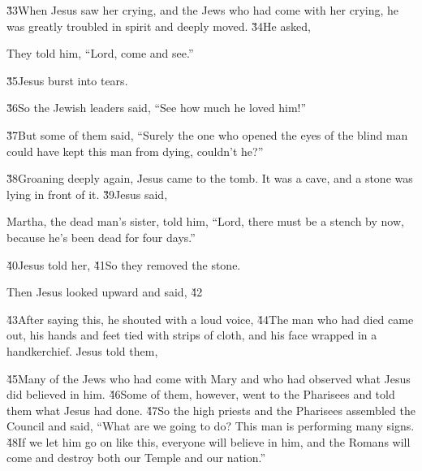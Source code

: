 \v{33}When Jesus saw her crying, and the Jews who had come with her crying, he was greatly troubled in spirit and deeply moved. \v{34}He asked, 

They told him, ``Lord, come and see.''

\v{35}Jesus burst into tears.

\v{36}So the Jewish leaders said, ``See how much he loved him!''

\v{37}But some of them said, ``Surely the one who opened the eyes of the blind man could have kept this man from dying, couldn't he?''

\v{38}Groaning deeply again, Jesus came to the tomb. It was a cave, and a stone was lying in front of it. \v{39}Jesus said, 

Martha, the dead man's sister, told him, ``Lord, there must be a stench by now, because he's been dead for four days.''

\v{40}Jesus told her,  \v{41}So they removed the stone.

Then Jesus looked upward and said,  \v{42}

\v{43}After saying this, he shouted with a loud voice,  \v{44}The man who had died came out, his hands and feet tied with strips of cloth, and his face wrapped in a handkerchief. Jesus told them, 

\v{45}Many of the Jews who had come with Mary and who had observed what Jesus did believed in him. \v{46}Some of them, however, went to the Pharisees and told them what Jesus had done. \v{47}So the high priests and the Pharisees assembled the Council and said, ``What are we going to do? This man is performing many signs. \v{48}If we let him go on like this, everyone will believe in him, and the Romans will come and destroy both our Temple and our nation.''

